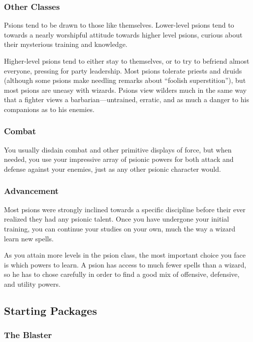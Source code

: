 \subsubsection{Other Classes}
Psions tend to be drawn to those like themselves. Lower-level psions tend to towards a nearly worshipful attitude towards higher level psions, curious about their mysterious training and knowledge.

Higher-level psions tend to either stay to themselves, or to try to befriend almost everyone, pressing for party leadership. Most psions tolerate priests and druids (although some psions make needling remarks about ``foolish superstition''), but most psions are uneasy with wizards. Psions view wilders much in the same way that a fighter views a barbarian---untrained, erratic, and as much a danger to his companions as to his enemies.

\subsubsection{Combat}

You usually disdain combat and other primitive displays of force, but when needed, you use your impressive array of psionic powers for both attack and defense against your enemies, just as any other psionic character would.

\subsubsection{Advancement}

Most psions were strongly inclined towards a specific discipline before their ever realized they had any psionic talent. Once you have undergone your initial training, you can continue your studies on your own, much the way a wizard learn new spells.

As you attain more levels in the psion class, the most important choice you face is which powers to learn. A psion has access to much fewer spells than a wizard, so he has to chose carefully in order to find a good mix of offensive, defensive, and utility powers.

\subsection{Starting Packages}
\subsubsection{The Blaster}

